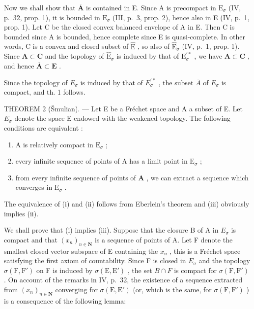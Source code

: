Now we shall show that \(\overline{\mathbf{A}}\) is contained in E. Since A is precompact in \(\mathrm{E}_{\sigma}\) (IV, p.~32, prop. 1), it is bounded in \(\mathrm{E}_{\sigma}\) (III, p.~3, prop. 2), hence also in E (IV, p.~1, prop. 1). Let C be the closed convex balanced envelope of A in E. Then C is bounded since A is bounded, hence complete since E is quasi-complete. In other words, C is a convex and closed subset of \(\hat{\mathrm{E}}\) , so also of \(\hat{\mathrm{E}}_{\sigma}\) (IV, p.~1, prop. 1). Since \(\mathbf{A} \subset \mathbf{C}\) and the topology of \(\hat{\mathrm{E}}_{\sigma}\) is induced by that of \(\mathrm{E}_{\sigma}^{\prime *}\) , we have \(\overline{\mathbf{A}} \subset \mathbf{C}\) , and hence \(\overline{\mathbf{A}} \subset \mathbf{E}\) .

Since the topology of \(E_{\sigma}\) is induced by that of \(E_{\sigma}^{\prime*}\) , the subset \(\overline{A}\) of \(E_{\sigma}\) is compact, and th. 1 follows.

THEOREM 2 (Šmulian). --- Let E be a Fréchet space and A a subset of E. Let \(E_{\sigma}\) denote the space E endowed with the weakened topology. The following conditions are equivalent :

\begin{enumerate}
\def\labelenumi{(\roman{enumi})}
\item
  A is relatively compact in \(\mathrm{E}_{\sigma}\) ;
\item
  every infinite sequence of points of A has a limit point in \(\mathrm{E}_{\sigma}\) ;
\item
  from every infinite sequence of points of \(\mathbf{A}\) , we can extract a sequence which converges in \(\mathrm{E}_{\sigma}\) .
\end{enumerate}

The equivalence of (i) and (ii) follows from Eberlein's theorem and (iii) obviously implies (ii).

We shall prove that (i) implies (iii). Suppose that the closure B of A in \(E_{\sigma}\) is compact and that \((x_{n})_{n\in\mathbf{N}}\) is a sequence of points of A. Let F denote the smallest closed vector subspace of E containing the \(x_{n}\) , this is a Fréchet space satisfying the first axiom of countability. Since F is closed in \(E_{\sigma}\) and the topology \(\sigma(\mathrm{F},\mathrm{F}')\) on F is induced by \(\sigma(\mathrm{E},\mathrm{E}')\) , the set \(B\cap F\) is compact for \(\sigma(\mathrm{F},\mathrm{F}')\) . On account of the remarks in IV, p.~32, the existence of a sequence extracted from \((x_{n})_{n\in\mathbf{N}}\) converging for \(\sigma(\mathrm{E},\mathrm{E}')\) (or, which is the same, for \(\sigma(\mathrm{F},\mathrm{F}')\) ) is a consequence of the following lemma:

